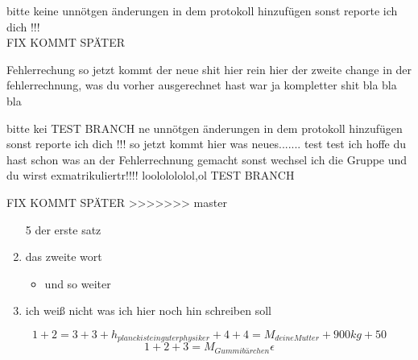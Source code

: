 \documentclass[a4paper]{scrartcl}
\begin{document}
		 \huge bitte keine unnötgen änderungen in dem protokoll hinzufügen sonst reporte ich dich !!!
		 \vspace{20pt}
		  \\ {\huge FIX KOMMT SPÄTER }
		  
		  
		 Fehlerrechung so jetzt kommt der neue shit hier rein
		 hier der zweite change in der fehlerrechnung, was du vorher ausgerechnet hast war ja kompletter shit
		 bla bla bla

		 \huge bitte kei TEST BRANCH ne unnötgen änderungen in dem protokoll hinzufügen sonst reporte ich dich !!!    so jetzt kommt hier was neues....... test test ich hoffe du hast schon was an der Fehlerrechnung gemacht sonst wechsel ich die Gruppe und du wirst exmatrikuliertr!!!! loololololol,ol
		 \huge  \huge \centering TEST BRANCH
		 
		 \vspace{20pt} {\huge FIX KOMMT SPÄTER }
>>>>>>> master
		
		
		
		
		\begin{enumerate}
			\item[5] der erste satz
			\item das zweite wort 
			\begin{itemize}
			\item und so weiter
			\end{itemize}
			\item ich weiß nicht was ich hier noch hin schreiben soll
		\end{enumerate}
	
	 $$1+2=3+3+h_{planck ist ein guter physiker}+4+4=M_{deine Mutter}+900 {kg}+50$$
	 \begin{equation}
	 1+2+3=M_{Gummibärchen}
	  \epsilon
	 \end{equation}
\end{document}
